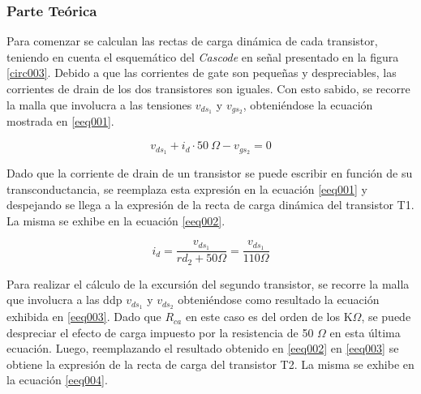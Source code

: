 \documentclass[a4paper,10pt]{article}
\begin{document}
			\subsubsection{Parte Teórica}
				\indent Para comenzar se calculan las rectas de carga dinámica de cada transistor, teniendo en cuenta el esquemático del
				\emph{Cascode} en señal presentado en la figura \ref{circ003}. Debido a que las corrientes de gate son pequeñas y despreciables, las corrientes de drain
				de los dos transistores son iguales. Con esto sabido, se recorre la malla que involucra a las tensiones $v_{ds_1}$ y $v_{gs_2}$, obteniéndose la 
				ecuación mostrada en \ref{eeq001}.
			
				\begin{equation}
					v_{ds_1} + i_d \cdot 50~\Omega - v_{gs_2} = 0 \label{eeq001}
				\end{equation}

				Dado que la corriente de drain de un transistor se puede escribir en función de su transconductancia, se reemplaza esta expresión en la
				ecuación \ref{eeq001} y despejando se llega a la expresión de la recta de carga dinámica del transistor T1. La misma se exhibe en la ecuación 
				\ref{eeq002}.

				\begin{equation}
					i_d = \frac{v_{ds_1}}{r{d_2} + 50 \Omega} = \frac{v_{ds_1}}{110 \Omega} \label{eeq002}
				\end{equation}

				Para realizar el cálculo de la excursión del segundo transistor, se recorre la malla que involucra a las ddp $v_{ds_1}$ y $v_{ds_2}$ obteniéndose como
				resultado la ecuación exhibida en \ref{eeq003}. Dado que $R_{ca}$ en este caso es del orden de los K$\Omega$, se puede despreciar el efecto de carga 
				impuesto por la resistencia de 50 $\Omega$ en esta última ecuación. Luego, reemplazando el resultado obtenido en \ref{eeq002} en \ref{eeq003} se 
				obtiene la expresión de la recta de carga del transistor T2. La misma se exhibe en la ecuación \ref{eeq004}.
\end{document}
